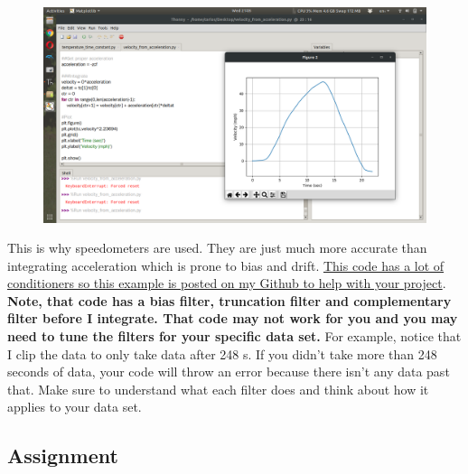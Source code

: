 \begin{figure}[H]
  \begin{center}
    \includegraphics[width=\textwidth]{Figures/accelerometer_integration.png}
  \end{center}
\end{figure}
This is why speedometers are used. They are just much more accurate than integrating acceleration which is prone to bias and drift. \href{https://github.com/cmontalvo251/Python/blob/master/instrumentation/cpx_assignments/velocity_from_acceleration.py}{This code has a lot of conditioners so this example is posted on my Github to help with your project}. {\bf Note, that code has a bias filter, truncation filter and complementary filter before I integrate. That code may not work for you and you may need to tune the filters for your specific data set.} For example, notice that I clip the data to only take data after 248 s. If you didn't take more than 248 seconds of data, your code will throw an error because there isn't any data past that. Make sure to understand what each filter does and think about how it applies to your data set.

\subsection{Assignment}



